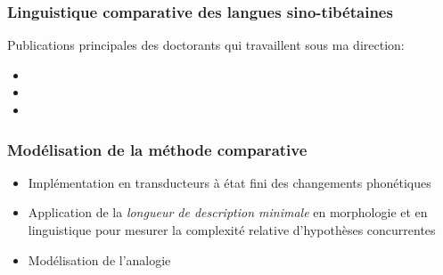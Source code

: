 \documentclass[xcolor=table]{beamer}
\begin{document}
   \begin{frame} 
 \frametitle{Linguistique comparative des langues sino-tibétaines} 
 
Publications principales des doctorants qui travaillent sous ma direction:
\begin{itemize}
\item  {}
\item  {}  
\item  {}
\end{itemize}   
   \end{frame} 



   \begin{frame} 
 \frametitle{Modélisation de la méthode comparative} 
 \begin{itemize}%
 \item  Implémentation en transducteurs à état fini des changements phonétiques
  \item Application de la \textit{longueur de description minimale} en morphologie et en linguistique pour mesurer la complexité relative d'hypothèses concurrentes
  \item Modélisation de l'analogie
\end{itemize}
   \end{frame} 
   
\end{document}
